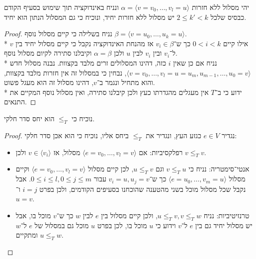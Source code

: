 \Subquestion{}
יהי מסלול ללא חזרות $\alpha = \langle v = v_0, \dots, v_l = u \rangle$ ונניח באינדוקציה תוך שימוש בסעיף הקודם כבסיס שלכל $2 \le k' < k$ יש מסלול ללא חזרות יחיד, ונוכיח כי גם המסלול הנתון הוא יחיד.
\begin{proof}
	נניח בשלילה כי קיים מסלול נוסף $\beta = \langle v = u_0, \dots, u_k = u \rangle$. \\*
	אילו קיים $0 < i < k$ כך ש־$v_i \in \beta$ אז מהנחת האינדוקציה נקבל כי קיים מסלול יחיד בין $v$ ל־$v_i$ ובין $v_i$ לבין $u$ ולכן $\alpha = \beta$ וקיבלנו סתירה לקיום מסלול נוסף. \\*
	נניח אם כן שאין $i$ כזה, דהינו המסלולים זרים מלבד בקצוות.
	נבנה מסלול חדש $\langle v = v_0, \dots, v_l = u = u_m, u_{m - 1}, \dots, u_0 = v \rangle$, נבחין כי במסלול זה אין חזרות מלבד בקצוות, והוא מתחיל ונגמר ב־$v$, דהינו מסלול זה הוא מעגל פשוט. \\*
	ידוע כי ב־$T$ אין מעגלים מהגדרתו כעץ ולכן קיבלנו סתירה, ואין מסלול נוסף המקיים את התנאים.
\end{proof}

\Subquestion{}
נוכיח כי $\le_T$ הוא יחס סדר חלקי.
\begin{proof}
	נגדיר $e \in V$ כגזע העץ, ונגדיר את $\le_T$ ביחס אליו, נוכיח כי הוא אכן סדר חלקי:
	\begin{itemize}
		\item רפלקסיביות: אם $\langle e = v_0, \dots, v_l = v \rangle$ מסלול, אז $v \in \langle v_i \rangle$ ולכן $v \le_T v$.
		\item אנטי־סימטריה: נניח כי $v \le_T u$ וגם $u \le_T v$,
			לכן קיים מסלול $\langle e = v_0, \dots, v_l = v \rangle$ וקיים מסלול $\langle e = u_0, \dots, v_m = u \rangle$ כך ש־$v_i = u, u_j = v$ עבור $0 \le i \le l, 0 \le j \le m$.
			אבל נקבל שכל מסלול מוכל בשני מהטענה שהוכחנו בסעיפים הקודמים, ולכן בפרט $i = j$ ו־$u = v$.
		\item טרנזיטיביות: נניח $u \le_T v, v \le_T w$, ולכן קיים מסלול בין $e$ לבין $w$ כך ש־$v$ מוכל בו, אבל יש מסלול יחיד גם בין $e$ ל־$v$ וידוע כי $u$ מוכל בו, לכן בפרט $u$ מוכל גם במסלול של $e$ ל־$w$ ומתקיים $u \le_T w$.
	\end{itemize}
\end{proof}

